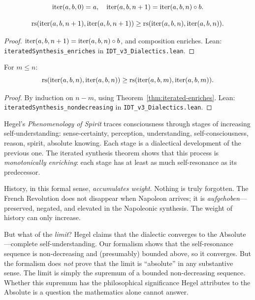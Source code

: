 \begin{definition}
\label{def:iterated-synthesis}
\[
\mathrm{iter}(a, b, 0) = a, \quad \mathrm{iter}(a, b, n+1) = \mathrm{iter}(a, b, n) \circ b.
\]
\end{definition}

\begin{theorem}
\label{thm:iterated-enriches}
\[
\mathrm{rs}(\mathrm{iter}(a, b, n+1), \mathrm{iter}(a, b, n+1)) \geq
\mathrm{rs}(\mathrm{iter}(a, b, n), \mathrm{iter}(a, b, n)).
\]
\end{theorem}

\begin{proof}
$\mathrm{iter}(a,b,n+1) = \mathrm{iter}(a,b,n) \circ b$, and composition
enriches.
Lean: \texttt{iteratedSynthesis\_enriches} in \texttt{IDT\_v3\_Dialectics.lean}.
\end{proof}

\begin{theorem}
\label{thm:historical-monotonicity}
For $m \leq n$:
\[
\mathrm{rs}(\mathrm{iter}(a, b, n), \mathrm{iter}(a, b, n)) \geq
\mathrm{rs}(\mathrm{iter}(a, b, m), \mathrm{iter}(a, b, m)).
\]
\end{theorem}

\begin{proof}
By induction on $n - m$, using Theorem~\ref{thm:iterated-enriches}.
Lean: \texttt{iteratedSynthesis\_nondecreasing} in \texttt{IDT\_v3\_Dialectics.lean}.
\end{proof}

\begin{interpretation}
\label{interp:march-of-spirit}
Hegel's \textit{Phenomenology of Spirit} traces consciousness through stages
of increasing self-understanding: sense-certainty, perception, understanding,
self-consciousness, reason, spirit, absolute knowing. Each stage is a
dialectical development of the previous one. The iterated synthesis
theorem shows that this process is \emph{monotonically enriching}: each
stage has at least as much self-resonance as its predecessor.

History, in this formal sense, \emph{accumulates weight}. Nothing is truly
forgotten. The French Revolution does not disappear when Napoleon arrives;
it is \emph{aufgehoben}---preserved, negated, and elevated in the Napoleonic
synthesis. The weight of history can only increase.

But what of the \emph{limit}? Hegel claims that the dialectic converges to the
Absolute---complete self-understanding. Our formalism shows that the
self-resonance sequence is non-decreasing and (presumably) bounded above, so
it converges. But the formalism does \emph{not} prove that the limit is
``absolute'' in any substantive sense. The limit is simply the supremum of a
bounded non-decreasing sequence. Whether this supremum has the philosophical
significance Hegel attributes to the Absolute is a question the mathematics
alone cannot answer.
\end{interpretation}


